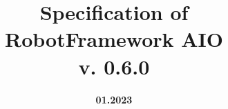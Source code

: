 
\title{\textbf{Specification of \\
\vspace{2ex}
RobotFramework AIO \\
\vspace{2ex}
v. 0.6.0}}
\date{\vspace{4ex}\textbf{01.2023}}


